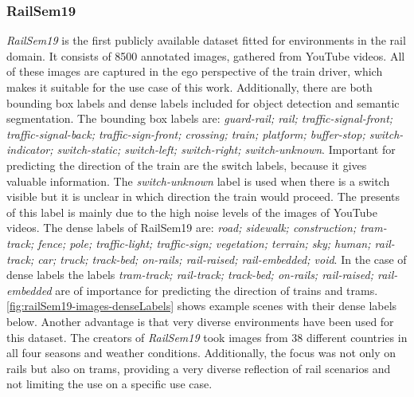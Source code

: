 
\subsubsection{RailSem19}
\textit{RailSem19} \cite{railsem19dataset} is the first publicly available dataset fitted for environments in the rail domain. It consists of 8500 annotated images, gathered from YouTube videos. All of these images are captured in the ego perspective of the train driver, which makes it suitable for the use case of this work. Additionally, there are both bounding box labels and dense labels included for object detection and semantic segmentation. The bounding box labels are: \textit{guard-rail; rail; traffic-signal-front; traffic-signal-back; traffic-sign-front; crossing; train; platform; buffer-stop; switch-indicator; switch-static; switch-left; switch-right; switch-unknown}. Important for predicting the direction of the train are the switch labels, because  it gives valuable information. The \textit{switch-unknown} label is used when there is a switch visible but it is unclear in which direction the train would proceed. The presents of this label is mainly due to the high noise levels of the images of YouTube videos.
The dense labels of RailSem19 are: \textit{road; sidewalk; construction; tram-track; fence; pole; traffic-light; traffic-sign; vegetation; terrain; sky; human; rail-track; car; truck; track-bed; on-rails; rail-raised; rail-embedded; void}. In the case of dense labels the labels \textit{tram-track; rail-track; track-bed; on-rails; rail-raised; rail-embedded} are of importance for predicting the direction of trains and trams. \autoref{fig:railSem19-images-denseLabels} shows example scenes with their dense labels below.
Another advantage is that very diverse environments have been used for this dataset. The creators of \textit{RailSem19} took images from 38 different countries in all four seasons and weather conditions. Additionally, the focus was not only on rails but also on trams, providing a very diverse reflection of rail scenarios and not limiting the use on a specific use case.


